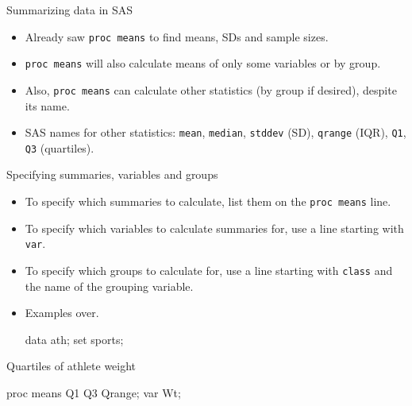 \documentclass[unknownkeysallowed]{beamer}\usepackage[]{graphicx}\usepackage[]{color}
\begin{document}
\begin{frame}[fragile]{Summarizing data in SAS}
  
  \begin{itemize}
  \item Already saw \texttt{proc means} to find means, SDs and sample
    sizes.
  \item \texttt{proc means} will also calculate means of only some
    variables or by group.
  \item Also, \texttt{proc means} can calculate other statistics (by
    group if desired), despite its name.
  \item SAS names for other statistics: \texttt{mean},
    \texttt{median}, \texttt{stddev} (SD), \texttt{qrange} (IQR),
    \texttt{Q1}, \texttt{Q3} (quartiles).
  \end{itemize}
  
\end{frame}

\begin{frame}[fragile]{Specifying summaries, variables and groups}
  
  \begin{itemize}
  \item To specify which summaries to calculate, list them on the
    \texttt{proc means} line.
  \item To specify which variables to calculate summaries for, use a
    line starting with \texttt{var}.
  \item To specify which groups to calculate for, use a line starting
    with \texttt{class} and the name of the grouping variable.
  \item Examples over.

    \begin{Datastep}[program]
data ath;
  set sports;
      \end{Datastep}
    
  \end{itemize}
  
\end{frame}

\begin{frame}[fragile]{Quartiles of athlete weight}
  
  \begin{Sascode}[store=sa]
proc means Q1 Q3 Qrange;
  var Wt;
  \end{Sascode}
  
  
\end{frame}
\end{document}
